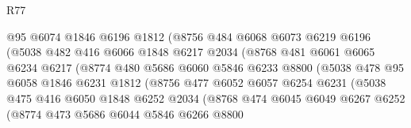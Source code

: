 \begin{lexlean}{R77}
\begin{coremodule}
                          @95
                          @6074
                          @1846
                          @6196
                          @1812
                          (@8756
                            @484
                            @6068
                            @6073
                            @6219
                            @6196
                            (@5038
                              @482
                              @416
                              @6066
                              @1848
                              @6217
                              @2034
                              (@8768
                                @481
                                @6061
                                @6065
                                @6234
                                @6217
                                (@8774
                                  @480
                                  @5686
                                  @6060
                                  @5846
                                  @6233
                                  @8800
                                  (@5038
                                    @478
                                    @95
                                    @6058
                                    @1846
                                    @6231
                                    @1812
                                    (@8756
                                      @477
                                      @6052
                                      @6057
                                      @6254
                                      @6231
                                      (@5038
                                        @475
                                        @416
                                        @6050
                                        @1848
                                        @6252
                                        @2034
                                        (@8768
                                          @474
                                          @6045
                                          @6049
                                          @6267
                                          @6252
                                          (@8774
                                            @473
                                            @5686
                                            @6044
                                            @5846
                                            @6266
                                            @8800

\end{coremodule}
\end{lexlean}
